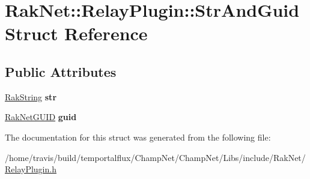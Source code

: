 \hypertarget{struct_rak_net_1_1_relay_plugin_1_1_str_and_guid}{\section{Rak\-Net\-:\-:Relay\-Plugin\-:\-:Str\-And\-Guid Struct Reference}
\label{struct_rak_net_1_1_relay_plugin_1_1_str_and_guid}
}
\subsection*{Public Attributes}
\begin{DoxyCompactItemize}
\item 
\hypertarget{struct_rak_net_1_1_relay_plugin_1_1_str_and_guid_a51b242dfb3c4da9a9359f06ff297e6f0}{\hyperlink{class_rak_net_1_1_rak_string}{Rak\-String} {\bfseries str}}\label{struct_rak_net_1_1_relay_plugin_1_1_str_and_guid_a51b242dfb3c4da9a9359f06ff297e6f0}

\item 
\hypertarget{struct_rak_net_1_1_relay_plugin_1_1_str_and_guid_a4e51924975e7eb77300e7bb153b260d0}{\hyperlink{struct_rak_net_1_1_rak_net_g_u_i_d}{Rak\-Net\-G\-U\-I\-D} {\bfseries guid}}\label{struct_rak_net_1_1_relay_plugin_1_1_str_and_guid_a4e51924975e7eb77300e7bb153b260d0}

\end{DoxyCompactItemize}


The documentation for this struct was generated from the following file\-:\begin{DoxyCompactItemize}
\item 
/home/travis/build/temportalflux/\-Champ\-Net/\-Champ\-Net/\-Libs/include/\-Rak\-Net/\hyperlink{_relay_plugin_8h}{Relay\-Plugin.\-h}\end{DoxyCompactItemize}
